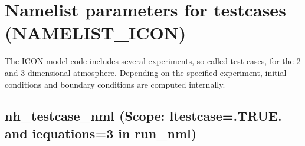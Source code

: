 \newpage

%

%
%



\section{Namelist parameters for testcases (NAMELIST\_ICON)}

The ICON model code includes several experiments, so-called test cases,
for the 2 and 3-dimensional atmosphere. Depending on the specified experiment, 
initial conditions and boundary conditions are computed internally.



\subsection{nh\_testcase\_nml (Scope: ltestcase=.TRUE. and iequations=3 in run\_nml)}

